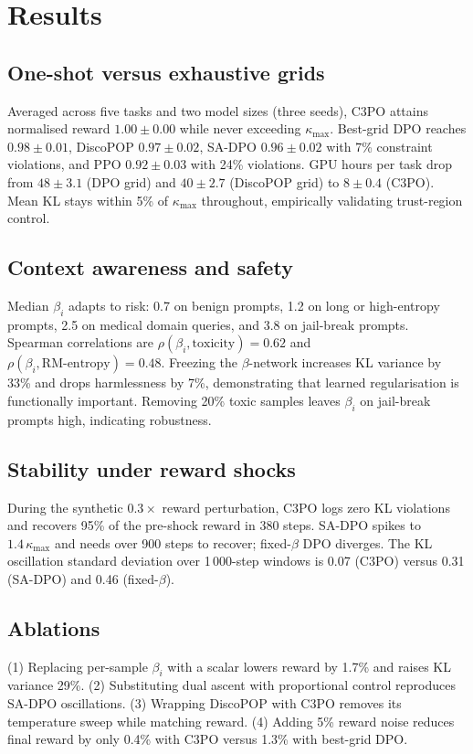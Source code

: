 \documentclass{article}
\begin{document}
\section{Results}
\subsection{One-shot versus exhaustive grids}
Averaged across five tasks and two model sizes (three seeds), C3PO attains normalised reward \(1.00 \pm 0.00\) while never exceeding \(\kappa_{\max}\). Best-grid DPO reaches \(0.98 \pm 0.01\), DiscoPOP \(0.97 \pm 0.02\), SA-DPO \(0.96 \pm 0.02\) with 7\% constraint violations, and PPO \(0.92 \pm 0.03\) with 24\% violations. GPU hours per task drop from \(48 \pm 3.1\) (DPO grid) and \(40 \pm 2.7\) (DiscoPOP grid) to \(8 \pm 0.4\) (C3PO). Mean KL stays within 5\% of \(\kappa_{\max}\) throughout, empirically validating trust-region control.

\subsection{Context awareness and safety}
Median \(\beta_i\) adapts to risk: 0.7 on benign prompts, 1.2 on long or high-entropy prompts, 2.5 on medical domain queries, and 3.8 on jail-break prompts. Spearman correlations are \(\rho(\beta_i, \text{toxicity}) = 0.62\) and \(\rho(\beta_i, \text{RM-entropy}) = 0.48\). Freezing the \(\beta\)-network increases KL variance by 33\% and drops harmlessness by 7\%, demonstrating that learned regularisation is functionally important. Removing 20\% toxic samples leaves \(\beta_i\) on jail-break prompts high, indicating robustness.

\subsection{Stability under reward shocks}
During the synthetic \(0.3\times\) reward perturbation, C3PO logs zero KL violations and recovers 95\% of the pre-shock reward in 380 steps. SA-DPO spikes to \(1.4\,\kappa_{\max}\) and needs over 900 steps to recover; fixed-\(\beta\) DPO diverges. The KL oscillation standard deviation over 1\,000-step windows is 0.07 (C3PO) versus 0.31 (SA-DPO) and 0.46 (fixed-\(\beta\)).

\subsection{Ablations}
(1) Replacing per-sample \(\beta_i\) with a scalar lowers reward by 1.7\% and raises KL variance 29\%. (2) Substituting dual ascent with proportional control reproduces SA-DPO oscillations. (3) Wrapping DiscoPOP with C3PO removes its temperature sweep while matching reward. (4) Adding 5\% reward noise reduces final reward by only 0.4\% with C3PO versus 1.3\% with best-grid DPO.
\end{document}

